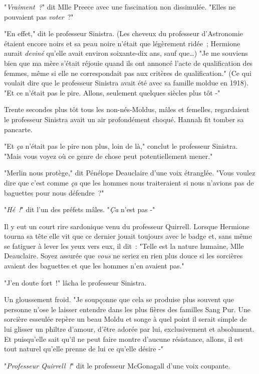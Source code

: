 "\emph{Vraiment~?}" dit Mlle Preece avec une fascination non dissimulée. "Elles ne pouvaient pas \emph{voter}~?"

"En effet," dit le professeur Sinistra. (Les cheveux du professeur d'Astronomie étaient encore noirs et sa peau noire n'était que légèrement ridée~; Hermione aurait \emph{deviné} qu'elle avait environ soixante-dix ans, sauf que…) "Je me souviens bien que ma mère s'était réjouie quand ils ont annoncé l'acte de qualification des femmes, même si elle ne correspondait pas aux critères de qualification." (Ce qui voulait dire que le professeur Sinistra avait été avec sa famille moldue en 1918). "Et ce n'était pas le pire. Allons, seulement quelques siècles plus tôt -"

Trente secondes plus tôt tous les non-nés-Moldus, mâles et femelles, regardaient le professeur Sinistra avait un air profondément choqué. Hannah fit tomber sa pancarte.

"Et \emph{ça} n'était pas le pire non plus, loin de là," conclut le professeur Sinistra. "Mais vous voyez où ce genre de chose peut potentiellement mener."

"Merlin nous protège," dit Pénélope Deauclaire d'une voix étranglée. "Vous voulez dire que c'est comme \emph{ça} que les hommes nous traiteraient si nous n'avions pas de baguettes pour nous défendre~?"

"\emph{Hé~!}" dit l'un des préfets mâles. "\emph{Ça} n'est pas -"

Il y eut un court rire sardonique venu du professeur Quirrell. Lorsque Hermione tourna sa tête elle vit que ce dernier jouait toujours avec le badge et, sans même se fatiguer à lever les yeux vers eux, il dit~: "Telle est la nature humaine, Mlle Deauclaire. Soyez assurée que \emph{vous} ne seriez en rien plus douce si les sorcières avaient des baguettes et que les hommes n'en avaient pas."

"J'en doute fort~!" lâcha le professeur Sinistra.

Un gloussement froid. "Je soupçonne que cela se produise plus souvent que personne n'ose le laisser entendre dans les plus fières des familles Sang Pur. Une sorcière esseulée repère un beau Moldu et songe à quel point il serait simple de lui glisser un philtre d'amour, d'être adorée par lui, exclusivement et absolument. Et puisqu'elle sait qu'il ne peut faire montre d'aucune résistance, allons, il est tout naturel qu'elle prenne de lui ce qu'elle désire -"

"\emph{Professeur Quirrell~!}" dit le professeur McGonagall d'une voix coupante.

